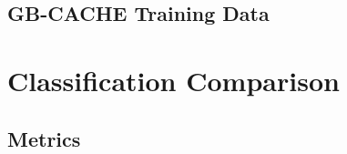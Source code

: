 \documentclass{erauthesis}
\begin{document}




\subsection{GB-CACHE Training Data} \label{training_data_gbcache}

\section{Classification Comparison} \label{sec:classify}
\subsection{Metrics} \label{classify_metrics}
\end{document}
